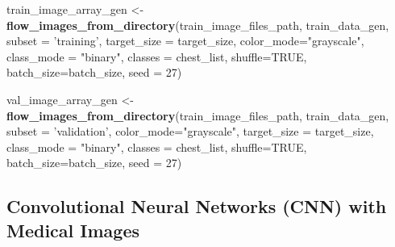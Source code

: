 \documentclass[12pt]{article}
\newenvironment{Shaded}{\begin{snugshade}}{\end{snugshade}}
\newcommand{\DataTypeTok}[1]{\textcolor[rgb]{0.13,0.29,0.53}{#1}}
\newcommand{\DecValTok}[1]{\textcolor[rgb]{0.00,0.00,0.81}{#1}}
\newcommand{\KeywordTok}[1]{\textcolor[rgb]{0.13,0.29,0.53}{\textbf{#1}}}
\newcommand{\NormalTok}[1]{#1}
\newcommand{\OtherTok}[1]{\textcolor[rgb]{0.56,0.35,0.01}{#1}}
\newcommand{\StringTok}[1]{\textcolor[rgb]{0.31,0.60,0.02}{#1}}
\begin{document}
\begin{Shaded}
\begin{Highlighting}[]
\NormalTok{train_image_array_gen <-}\StringTok{ }\KeywordTok{flow_images_from_directory}\NormalTok{(train_image_files_path, }
\NormalTok{                                          train_data_gen,}
                                          \DataTypeTok{subset =} \StringTok{'training'}\NormalTok{,}
                                          \DataTypeTok{target_size =}\NormalTok{ target_size,}
                                          \DataTypeTok{color_mode=}\StringTok{"grayscale"}\NormalTok{,}
                                          \DataTypeTok{class_mode =} \StringTok{"binary"}\NormalTok{,}
                                          \DataTypeTok{classes =}\NormalTok{ chest_list,}
                                          \DataTypeTok{shuffle=}\OtherTok{TRUE}\NormalTok{,}
                                          \DataTypeTok{batch_size=}\NormalTok{batch_size,}
                                          \DataTypeTok{seed =} \DecValTok{27}\NormalTok{)}

\NormalTok{val_image_array_gen <-}\StringTok{ }\KeywordTok{flow_images_from_directory}\NormalTok{(train_image_files_path, }
\NormalTok{                                          train_data_gen,}
                                          \DataTypeTok{subset =} \StringTok{'validation'}\NormalTok{,}
                                          \DataTypeTok{color_mode=}\StringTok{"grayscale"}\NormalTok{,}
                                          \DataTypeTok{target_size =}\NormalTok{ target_size,}
                                          \DataTypeTok{class_mode =} \StringTok{"binary"}\NormalTok{,}
                                          \DataTypeTok{classes =}\NormalTok{ chest_list,}
                                          \DataTypeTok{shuffle=}\OtherTok{TRUE}\NormalTok{,}
                                          \DataTypeTok{batch_size=}\NormalTok{batch_size,}
                                          \DataTypeTok{seed =} \DecValTok{27}\NormalTok{)}
\end{Highlighting}
\end{Shaded}

\hypertarget{convolutional-neural-networks-cnn-with-medical-images}{%
\subsection{Convolutional Neural Networks (CNN) with Medical
Images}\label{convolutional-neural-networks-cnn-with-medical-images}}
\end{document}
